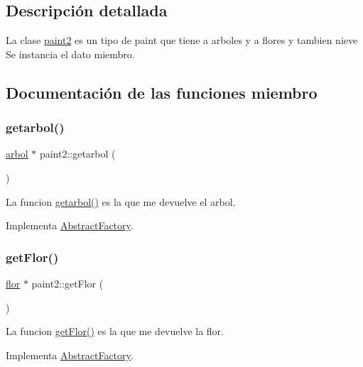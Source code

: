 \subsection{Descripción detallada}
La clase \hyperlink{classpaint2}{paint2} es un tipo de paint que tiene a arboles y a flores y tambien nieve  Se instancia el dato miembro. 

\subsection{Documentación de las funciones miembro}
\mbox{\label{classpaint2_a07e7d130f298e613dcdecf073acc8734}} 
\subsubsection{\texorpdfstring{getarbol()}{getarbol()}}
{\footnotesize\ttfamily \hyperlink{classarbol}{arbol} $\ast$ paint2\+::getarbol (\begin{DoxyParamCaption}{ }\end{DoxyParamCaption})\hspace{0.3cm}{\ttfamily [virtual]}}

La funcion \hyperlink{classpaint2_a07e7d130f298e613dcdecf073acc8734}{getarbol()} es la que me devuelve el arbol. 

Implementa \hyperlink{classAbstractFactory}{Abstract\+Factory}.

\mbox{\label{classpaint2_af06042693fb9817ae4fa381a1d5699c9}} 
\subsubsection{\texorpdfstring{get\+Flor()}{getFlor()}}
{\footnotesize\ttfamily \hyperlink{classflor}{flor} $\ast$ paint2\+::get\+Flor (\begin{DoxyParamCaption}{ }\end{DoxyParamCaption})\hspace{0.3cm}{\ttfamily [virtual]}}

La funcion \hyperlink{classpaint2_af06042693fb9817ae4fa381a1d5699c9}{get\+Flor()} es la que me devuelve la flor. 

Implementa \hyperlink{classAbstractFactory}{Abstract\+Factory}.

